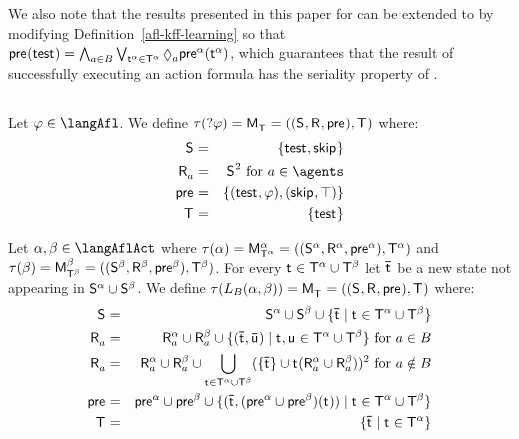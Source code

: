 We also note that the results presented in this paper for \classKFF{} can be extended to \classKD{} by modifying Definition~\ref{afl-kff-learning} so that $\aPrecondition(\aStateTest) = \bigwedge_{\agentA \in \agentsB} \bigvee_{\aStateT[\alpha] \in \aStatesT[\alpha]} \possibleA \aPrecondition[\alpha](\aStateT[\alpha])$, which guarantees that the result of successfully executing an action formula has the seriality property of \classKD{}.

\subsection{\classS{}}

\begin{definition}[Test]\label{afl-s-test}
Let $\phi \in \langAfl$. 
We define $\tau(\test{\phi}) = \aPModel{\aStatesT} = \aPModelTuple{\aStatesT}$ where:
\begin{eqnarray*}
    \aStates &=& \{\aStateTest, \aStateSkip\}\\
    \aAccessibility{\agentA} &=& \aStates^2 \text{ for } \agentA \in \agents\\
    \aPrecondition &=& \{(\aStateTest, \phi), (\aStateSkip, \top)\}\\
    \aStatesT &=& \{\aStateTest\}
\end{eqnarray*}
\end{definition}

\begin{definition}[Learning]\label{afl-s-learning}
Let $\alpha, \beta \in \langAflAct$ where $\tau(\alpha) = \aPModel[\alpha]{\aStatesT[\alpha]} = \aPModelTuple[\alpha]{\aStatesT[\alpha]}$ and $\tau(\beta) = \aPModel[\beta]{\aStatesT[\beta]} = \aPModelTuple[\beta]{\aStatesT[\beta]}$.
For every $\aStateT \in \aStatesT[\alpha] \cup \aStatesT[\beta]$ let $\aPStateT$ be a new state not appearing in $\aStates[\alpha] \cup \aStates[\beta]$.
We define $\tau(\learns_\agentsB (\alpha, \beta)) = \aPModel{\aStatesT} = \aPModelTuple{\aStatesT}$ where:
\begin{eqnarray*}
    \aStates &=& \aStates[\alpha] \cup \aStates[\beta] \cup \{\aPStateT \mid \aStateT \in \aStatesT[\alpha] \cup \aStatesT[\beta]\}\\
    \aAccessibility{\agentA} &=& \aAccessibility[\alpha]{\agentA} \cup \aAccessibility[\beta]{\agentA} \cup \{(\aPStateT, \aPStateU) \mid \aStateT, \aStateU \in \aStatesT[\alpha] \cup \aStatesT[\beta]\} \text{ for } \agentA \in \agentsB\\
    \aAccessibility{\agentA} &=& \aAccessibility[\alpha]{\agentA} \cup \aAccessibility[\beta]{\agentA} \cup \bigcup_{\aStateT \in \aStatesT[\alpha] \cup \aStatesT[\beta]} (\{\aPStateT\} \cup \aStateT (\aAccessibility[\alpha]{\agentA} \cup \aAccessibility[\beta]{\agentA}))^2 \text{ for } \agentA \notin \agentsB\\
    \aPrecondition &=& \aPrecondition[\alpha] \cup \aPrecondition[\beta] \cup \{(\aPStateT, (\aPrecondition[\alpha] \cup \aPrecondition[\beta])(\aStateT)) \mid \aStateT \in \aStatesT[\alpha] \cup \aStatesT[\beta]\}\\
    \aStatesT &=& \{\aPStateT \mid \aStateT \in \aStatesT[\alpha]\}
\end{eqnarray*}
\end{definition}


